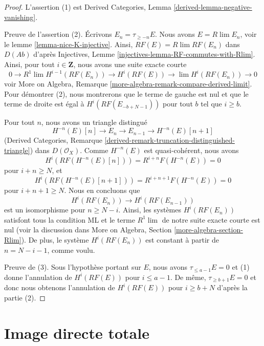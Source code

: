 \begin{proof}
L'assertion (1) est
Derived Categories, Lemma \ref{derived-lemma-negative-vanishing}.

\medskip\noindent
Preuve de l'assertion (2). Écrivons $E_n = \tau_{\geq -n}E$. Nous avons
$E = R\lim E_n$, voir le lemme \ref{lemma-nice-K-injective}. Ainsi,
$RF(E) = R\lim RF(E_n)$ dans $D(\textit{Ab})$ d'après Injectives, Lemme
\ref{injectives-lemma-RF-commutes-with-Rlim}. Ainsi, pour tout $i \in \mathbf{Z}$,
nous avons une suite exacte courte
$$
0 \to R^1\lim H^{i - 1}(RF(E_n)) \to H^i(RF(E)) \to \lim H^i(RF(E_n)) \to 0
$$
voir More on Algebra, Remarque
\ref{more-algebra-remark-compare-derived-limit}.
Pour démontrer (2), nous montrerons que le terme de gauche est nul
et que le terme de droite est égal à $H^i(RF(E_{-b + N - 1}))$
pour tout $b$ tel que $i \geq b$.

\medskip\noindent
Pour tout $n$, nous avons un triangle distingué
$$
H^{-n}(E)[n] \to E_n \to E_{n - 1} \to H^{-n}(E)[n + 1]
$$
(Derived Categories, Remarque
\ref{derived-remark-truncation-distinguished-triangle})
dans $D(\mathcal{O}_X)$. Comme $H^{-n}(E)$ est quasi-cohérent, nous avons
$$
H^i(RF(H^{-n}(E)[n])) = R^{i + n}F(H^{-n}(E)) = 0
$$
pour $i + n \geq N$, et
$$
H^i(RF(H^{-n}(E)[n + 1])) = R^{i + n + 1}F(H^{-n}(E)) = 0
$$
pour $i + n + 1 \geq N$. Nous en concluons que
$$
H^i(RF(E_n)) \to H^i(RF(E_{n - 1}))
$$
est un isomorphisme pour $n \geq N - i$. Ainsi, les systèmes $H^i(RF(E_n))$
satisfont tous la condition ML et le terme $R^1\lim$ de notre suite exacte
courte est nul (voir la discussion dans
More on Algebra, Section \ref{more-algebra-section-Rlim}).
De plus, le système $H^i(RF(E_n))$ est constant à partir de
$n = N - i - 1$, comme voulu.

\medskip\noindent
Preuve de (3). Sous l'hypothèse portant sur $E$, nous avons
$\tau_{\leq a - 1}E = 0$ et (1) donne l'annulation
de $H^i(RF(E))$ pour $i \leq a - 1$.
De même, $\tau_{\geq b + 1}E = 0$ et donc
nous obtenons l'annulation de $H^i(RF(E))$ pour $i \geq b + N$ d'après
la partie (2).
\end{proof}









\section{Image directe totale}
\label{section-total-direct-image}


